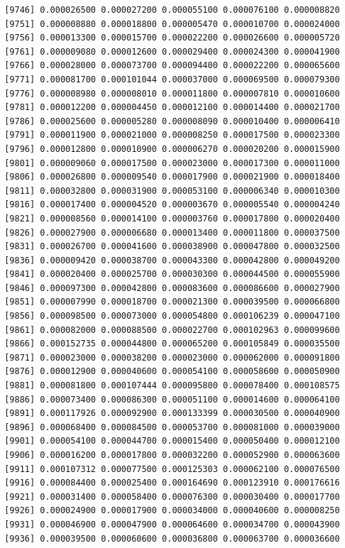 \documentclass[]{article}
\begin{document}
\begin{verbatim}
 [9746] 0.000026500 0.000027200 0.000055100 0.000076100 0.000008820
 [9751] 0.000008880 0.000018800 0.000005470 0.000010700 0.000024000
 [9756] 0.000013300 0.000015700 0.000022200 0.000026600 0.000005720
 [9761] 0.000009080 0.000012600 0.000029400 0.000024300 0.000041900
 [9766] 0.000028000 0.000073700 0.000094400 0.000022200 0.000065600
 [9771] 0.000081700 0.000101044 0.000037000 0.000069500 0.000079300
 [9776] 0.000008980 0.000008010 0.000011800 0.000007810 0.000010600
 [9781] 0.000012200 0.000004450 0.000012100 0.000014400 0.000021700
 [9786] 0.000025600 0.000005280 0.000008090 0.000010400 0.000006410
 [9791] 0.000011900 0.000021000 0.000008250 0.000017500 0.000023300
 [9796] 0.000012800 0.000010900 0.000006270 0.000020200 0.000015900
 [9801] 0.000009060 0.000017500 0.000023000 0.000017300 0.000011000
 [9806] 0.000026800 0.000009540 0.000017900 0.000021900 0.000018400
 [9811] 0.000032800 0.000031900 0.000053100 0.000006340 0.000010300
 [9816] 0.000017400 0.000004520 0.000003670 0.000005540 0.000004240
 [9821] 0.000008560 0.000014100 0.000003760 0.000017800 0.000020400
 [9826] 0.000027900 0.000006680 0.000013400 0.000011800 0.000037500
 [9831] 0.000026700 0.000041600 0.000038900 0.000047800 0.000032500
 [9836] 0.000009420 0.000038700 0.000043300 0.000042800 0.000049200
 [9841] 0.000020400 0.000025700 0.000030300 0.000044500 0.000055900
 [9846] 0.000097300 0.000042800 0.000083600 0.000086600 0.000027900
 [9851] 0.000007990 0.000018700 0.000021300 0.000039500 0.000066800
 [9856] 0.000098500 0.000073000 0.000054800 0.000106239 0.000047100
 [9861] 0.000082000 0.000088500 0.000022700 0.000102963 0.000099600
 [9866] 0.000152735 0.000044800 0.000065200 0.000105849 0.000035500
 [9871] 0.000023000 0.000038200 0.000023000 0.000062000 0.000091800
 [9876] 0.000012900 0.000040600 0.000054100 0.000058600 0.000050900
 [9881] 0.000081800 0.000107444 0.000095800 0.000078400 0.000108575
 [9886] 0.000073400 0.000086300 0.000051100 0.000014600 0.000064100
 [9891] 0.000117926 0.000092900 0.000133399 0.000030500 0.000040900
 [9896] 0.000068400 0.000084500 0.000053700 0.000081000 0.000039000
 [9901] 0.000054100 0.000044700 0.000015400 0.000050400 0.000012100
 [9906] 0.000016200 0.000017800 0.000032200 0.000052900 0.000063600
 [9911] 0.000107312 0.000077500 0.000125303 0.000062100 0.000076500
 [9916] 0.000084400 0.000025400 0.000164690 0.000123910 0.000176616
 [9921] 0.000031400 0.000058400 0.000076300 0.000030400 0.000017700
 [9926] 0.000024900 0.000017900 0.000034000 0.000040600 0.000008250
 [9931] 0.000046900 0.000047900 0.000064600 0.000034700 0.000043900
 [9936] 0.000039500 0.000060600 0.000036800 0.000063700 0.000036600

\end{verbatim}
\end{document}

